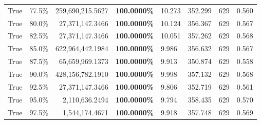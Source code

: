 \begin{table}[H]
\begin{tabular}{|m{}| m{}| r | R{0.13\textwidth}| R{0.09\textwidth}| R{0.09\textwidth}| R{0.09\textwidth}| R{0.11\textwidth}|}
True & 77.5\% & 259,690,215.5627 & \bfseries \color{red} 100.0000\% & 10.273 & 352.299 & 629 & 0.560 \\
True & 80.0\% & 27,371,147.3466 & \bfseries \color{red} 100.0000\% & 10.124 & 356.367 & 629 & 0.567 \\
True & 82.5\% & 27,371,147.3466 & \bfseries \color{red} 100.0000\% & 10.051 & 357.262 & 629 & 0.568 \\
True & 85.0\% & 622,964,442.1984 & \bfseries \color{red} 100.0000\% & 9.986 & 356.632 & 629 & 0.567 \\
True & 87.5\% & 65,659,969.1373 & \bfseries \color{red} 100.0000\% & 9.913 & 350.874 & 629 & 0.558 \\
True & 90.0\% & 428,156,782.1910 & \bfseries \color{red} 100.0000\% & 9.998 & 357.132 & 629 & 0.568 \\
True & 92.5\% & 27,371,147.3466 & \bfseries \color{red} 100.0000\% & 9.806 & 352.719 & 629 & 0.561 \\
True & 95.0\% & 2,110,636.2494 & \bfseries \color{red} 100.0000\% & 9.794 & 358.435 & 629 & 0.570 \\
True & 97.5\% & 1,544,174.4671 & \bfseries \color{red} 100.0000\% & 9.918 & 357.748 & 629 & 0.569 \\
\bottomrule
\end{tabular}
\end{table}
